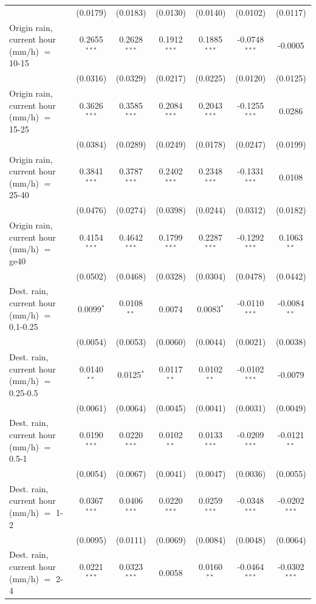 \begin{tabular}{lcccccc}
    & (0.0179) & (0.0183) & (0.0130) & (0.0140) & (0.0102) & (0.0117)\\
   Origin rain, current hour (mm/h) $=$ 10-15 & 0.2655$^{***}$ & 0.2628$^{***}$ & 0.1912$^{***}$ & 0.1885$^{***}$ & -0.0748$^{***}$ & -0.0005\\
    & (0.0316) & (0.0329) & (0.0217) & (0.0225) & (0.0120) & (0.0125)\\
   Origin rain, current hour (mm/h) $=$ 15-25 & 0.3626$^{***}$ & 0.3585$^{***}$ & 0.2084$^{***}$ & 0.2043$^{***}$ & -0.1255$^{***}$ & 0.0286\\
    & (0.0384) & (0.0289) & (0.0249) & (0.0178) & (0.0247) & (0.0199)\\
   Origin rain, current hour (mm/h) $=$ 25-40 & 0.3841$^{***}$ & 0.3787$^{***}$ & 0.2402$^{***}$ & 0.2348$^{***}$ & -0.1331$^{***}$ & 0.0108\\
    & (0.0476) & (0.0274) & (0.0398) & (0.0244) & (0.0312) & (0.0182)\\
   Origin rain, current hour (mm/h) $=$ ge40 & 0.4154$^{***}$ & 0.4642$^{***}$ & 0.1799$^{***}$ & 0.2287$^{***}$ & -0.1292$^{***}$ & 0.1063$^{**}$\\
    & (0.0502) & (0.0468) & (0.0328) & (0.0304) & (0.0478) & (0.0442)\\
   Dest. rain, current hour (mm/h) $=$ 0.1-0.25 & 0.0099$^{*}$ & 0.0108$^{**}$ & 0.0074 & 0.0083$^{*}$ & -0.0110$^{***}$ & -0.0084$^{**}$\\
    & (0.0054) & (0.0053) & (0.0060) & (0.0044) & (0.0021) & (0.0038)\\
   Dest. rain, current hour (mm/h) $=$ 0.25-0.5 & 0.0140$^{**}$ & 0.0125$^{*}$ & 0.0117$^{**}$ & 0.0102$^{**}$ & -0.0102$^{***}$ & -0.0079\\
    & (0.0061) & (0.0064) & (0.0045) & (0.0041) & (0.0031) & (0.0049)\\
   Dest. rain, current hour (mm/h) $=$ 0.5-1 & 0.0190$^{***}$ & 0.0220$^{***}$ & 0.0102$^{**}$ & 0.0133$^{***}$ & -0.0209$^{***}$ & -0.0121$^{**}$\\
    & (0.0054) & (0.0067) & (0.0041) & (0.0047) & (0.0036) & (0.0055)\\
   Dest. rain, current hour (mm/h) $=$ 1-2 & 0.0367$^{***}$ & 0.0406$^{***}$ & 0.0220$^{***}$ & 0.0259$^{***}$ & -0.0348$^{***}$ & -0.0202$^{***}$\\
    & (0.0095) & (0.0111) & (0.0069) & (0.0084) & (0.0048) & (0.0064)\\
   Dest. rain, current hour (mm/h) $=$ 2-4 & 0.0221$^{***}$ & 0.0323$^{***}$ & 0.0058 & 0.0160$^{**}$ & -0.0464$^{***}$ & -0.0302$^{***}$\\

\end{tabular}
